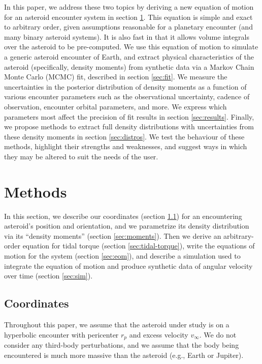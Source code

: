 \documentclass[fleqn,usenatbib]{mnras}
\begin{document}
In this paper, we address these two topics by deriving a new equation of motion for an asteroid encounter system in section \ref{sec:methods}. This equation is simple and exact to arbitrary order, given assumptions reasonable for a planetary encounter (and many binary asteroid systems). It is also fast in that it allows volume integrals over the asteroid to be pre-computed. We use this equation of motion to simulate a generic asteroid encounter of Earth, and extract physical characteristics of the asteroid (specifically, density moments) from synthetic data via a Markov Chain Monte Carlo (MCMC) fit, described in section \ref{sec:fit}. We measure the uncertainties in the posterior distribution of density moments as a function of various encounter parameters such as the observational uncertainty, cadence of observation, encounter orbital parameters, and more. We express which parameters most affect the precision of fit results in section \ref{sec:results}. Finally, we propose methods to extract full density distributions with uncertainties from these density moments in section \ref{sec:distros}. We test the behaviour of these methods, highlight their strengths and weaknesses, and suggest ways in which they may be altered to suit the needs of the user.

\section{Methods}
\label{sec:methods}

In this section, we describe our coordinates (section \ref{sec:coordinates}) for an encountering asteroid's position and orientation, and we parametrize its density distribution via its ``density moments'' (section \ref{sec:moments}). Then we derive an arbitrary-order equation for tidal torque (section \ref{sec:tidal-torque}), write the equations of motion for the system (section \ref{sec:eom}), and describe a simulation used to integrate the equation of motion and produce synthetic data of angular velocity over time (section \ref{sec:sim}).

\subsection{Coordinates}
\label{sec:coordinates}

Throughout this paper, we assume that the asteroid under study is on a hyperbolic encounter with pericenter $r_p$ and excess velocity $v_\infty$. We do not consider any third-body perturbations, and we assume that the body being encountered is much more massive than the asteroid (e.g., Earth or Jupiter).
\end{document}
